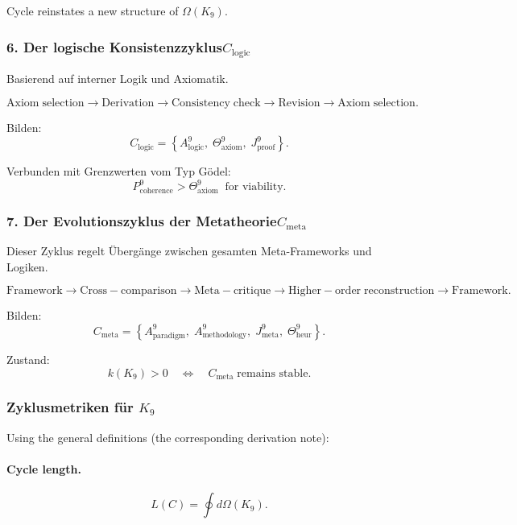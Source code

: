 Cycle reinstates a new structure of $\Omega(K_9)$.


\subsubsection{6. Der logische Konsistenzzyklus$C_{\mathrm{logic}}$}

Basierend auf interner Logik und Axiomatik.

\[
  \mathrm{Axiom\;selection}
  \to
  \mathrm{Derivation}
  \to
  \mathrm{Consistency\;check}
  \to
  \mathrm{Revision}
  \to
  \mathrm{Axiom\;selection}.
\]

Bilden:
\[
 C_{\mathrm{logic}}
  =
  \left\{
    A^9_{\mathrm{logic}},\;
    \Theta^9_{\mathrm{axiom}},\;
    J^9_{\mathrm{proof}}
  \right\}.
\]

Verbunden mit Grenzwerten vom Typ Gödel:
\[
  P^9_{\mathrm{coherence}} > \Theta^9_{\mathrm{axiom}}
  \;\;\text{for viability}.
\]


\subsubsection{7. Der Evolutionszyklus der Metatheorie$C_{\mathrm{meta}}$}

Dieser Zyklus regelt Übergänge zwischen gesamten Meta-Frameworks und Logiken.

\[
  \mathrm{Framework}
  \to
  \mathrm{Cross\!-\!comparison}
  \to
  \mathrm{Meta\!-\!critique}
  \to
  \mathrm{Higher\!-\!order\;reconstruction}
  \to
  \mathrm{Framework}.
\]

Bilden:
\[
 C_{\mathrm{meta}}
 =
 \left\{
   A^9_{\mathrm{paradigm}},\;
   A^9_{\mathrm{methodology}},\;
   J^9_{\mathrm{meta}},\;
   \Theta^9_{\mathrm{heur}}
 \right\}.
\]

Zustand:
\[
  k(K_9) > 0 \quad\Leftrightarrow\quad
  C_{\mathrm{meta}}\;\text{remains stable}.
\]


\subsubsection{Zyklusmetriken für \texorpdfstring{$K_9$}{K_9}}

Using the general definitions (the corresponding derivation note):

\paragraph{Cycle length.}
\[
  L(C) = \oint d\Omega(K_9).
\]

